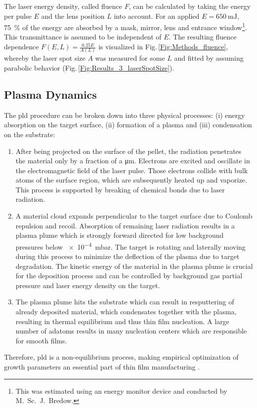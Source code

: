 The laser energy density, called fluence $F$, can be calculated by taking the energy per pulse $E$ and the lens position $L$ into account.
For an applied $E=\qty{650}{\milli\joule}$, \qty{75}{\percent} of the energy are absorbed by a mask, mirror, lens and entrance window\footnote{
    This was estimated using an energy monitor device and conducted by M.\ Sc.\ J.\ Bredow.}.
This transmittance is assumed to be independent of $E$.
The resulting fluence dependence $F(E,L)=\frac{0.25E}{A(L)}$ is visualized in Fig.\,\ref{Fig:Methods_fluence}, whereby the laser spot size $A$ was measured for some $L$ and fitted by assuming parabolic behavior (Fig.\,\ref{Fig:Results_3_laserSpotSize}).

\subsection{Plasma Dynamics}
The \gls{pld} procedure can be broken down into three physical processes: (i) energy absorption on the target surface, (ii) formation of a plasma and (iii) condensation on the substrate:
\begin{enumerate}[label=(\roman*)]
    \item After being projected on the surface of the pellet, the radiation penetrates the material only by a fraction of a \unit{\um}.
    Electrons are excited and oscillate in the electromagnetic field of the laser pulse.
    Those electrons collide with bulk atoms of the surface region, which are subsequently heated up and vaporize.
    This process is supported by breaking of chemical bonds due to laser radiation.
    \item A material cloud expands perpendicular to the target surface due to Coulomb repulsion and recoil.
    Absorption of remaining laser radiation results in a plasma plume which is strongly forward directed for low background pressures below \qty{e-4}{\milli\bar}.
    The target is rotating and laterally moving during this process to minimize the deflection of the plasma due to target degradation.
    The kinetic energy of the material in the plasma plume is crucial for the deposition process and can be controlled by background gas partial pressure and laser energy density on the target.
    \item The plasma plume hits the substrate which can result in resputtering of already deposited material, which condensates together with the plasma, resulting in thermal equilibrium and thus thin film nucleation.
    A large number of adatoms results in many nucleation centers which are responsible for smooth films.
\end{enumerate}
Therefore, \gls{pld} is a non-equilibrium process, making empirical optimization of growth parameters an essential part of thin film manufacturing
    \cite{lorenz2019}.

